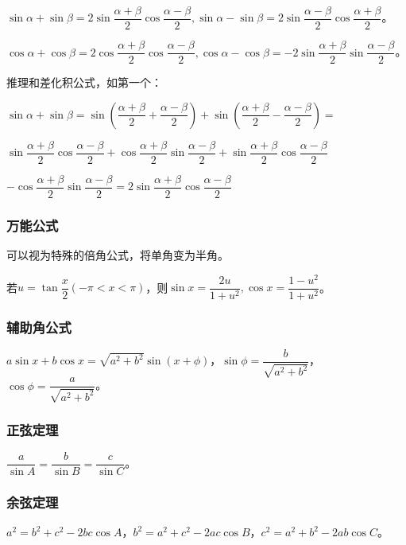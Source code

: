 \documentclass[UTF8, 12pt]{ctexart}
\begin{document}
        $\sin\alpha+\sin\beta=2\sin\dfrac{\alpha+\beta}{2}\cos\dfrac{\alpha-\beta}{2},\sin\alpha-\sin\beta=2\sin\dfrac{\alpha-\beta}{2}\cos\dfrac{\alpha+\beta}{2}$。

        $\cos\alpha+\cos\beta=2\cos\dfrac{\alpha+\beta}{2}\cos\dfrac{\alpha-\beta}{2},\cos\alpha-\cos\beta=-2\sin\dfrac{\alpha+\beta}{2}\sin\dfrac{\alpha-\beta}{2}$。

        推理和差化积公式，如第一个：

        $\sin\alpha+\sin\beta=\sin\left(\dfrac{\alpha+\beta}{2}+\dfrac{\alpha-\beta}{2}\right)+\sin\left(\dfrac{\alpha+\beta}{2}-\dfrac{\alpha-\beta}{2}\right)=$

        $\sin\dfrac{\alpha+\beta}{2}\cos\dfrac{\alpha-\beta}{2}+\cos\dfrac{\alpha+\beta}{2}\sin\dfrac{\alpha-\beta}{2}+\sin\dfrac{\alpha+\beta}{2}\cos\dfrac{\alpha-\beta}{2}$

        $-\cos\dfrac{\alpha+\beta}{2}\sin\dfrac{\alpha-\beta}{2}=2\sin\dfrac{\alpha+\beta}{2}\cos\dfrac{\alpha-\beta}{2}$

        \subsubsection{万能公式}

        可以视为特殊的倍角公式，将单角变为半角。

        若$u=\tan\dfrac{x}{2}(-\pi<x<\pi)$，则$\sin x=\dfrac{2u}{1+u^2},\cos x=\dfrac{1-u^2}{1+u^2}$。

        \subsubsection{辅助角公式}

        $a\sin x+b\cos x=\sqrt{a^2+b^2}\sin(x+\phi)$，$\sin\phi=\dfrac{b}{\sqrt{a^2+b^2}}$，$\cos\phi=\dfrac{a}{\sqrt{a^2+b^2}}$。

        \subsubsection{正弦定理}

        $\dfrac{a}{\sin A}=\dfrac{b}{\sin B}=\dfrac{c}{\sin C}$。

        \subsubsection{余弦定理}

        $a^2=b^2+c^2-2bc\cos A$，$b^2=a^2+c^2-2ac\cos B$，$c^2=a^2+b^2-2ab\cos C$。
\end{document}
